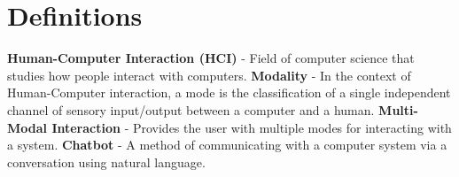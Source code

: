 \newpage

\section*{Definitions}

\textbf{Human-Computer Interaction (HCI)} - Field of computer science that studies how people interact with computers.\newline
\newline
\textbf{Modality} - In the context of Human-Computer interaction, a mode is the classification of a single independent channel of sensory input/output between a computer and a human.\newline
\newline
\textbf{Multi-Modal Interaction} - Provides the user with multiple modes for interacting with a system.\newline
\newline
\textbf{Chatbot} - A method of communicating with a computer system via a conversation using natural language.

\newpage
